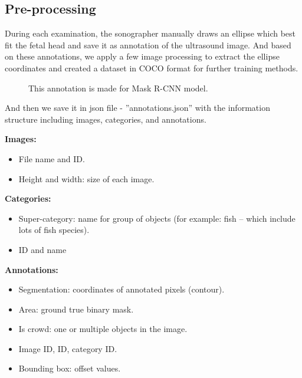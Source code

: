 	
\subsection{Pre-processing}
\label{subsection:preprocess}
\noindent

	During each examination, the sonographer manually draws an ellipse which best fit the fetal head and save it as annotation of the ultrasound image. And based on these annotations, we apply a few image processing to extract the ellipse coordinates and created a dataset in COCO format for further training methods.
	
	\begin{figure}[H]
		\centering
		\caption{This annotation is made for Mask R-CNN model.}
		\label{fig:processed_annotation}
	\end{figure}
	
	And then we save it in json file - ”annotations.json” with the information structure including images, categories, and annotations.

	\textbf{Images:}
\begin{itemize}
	\item File name and ID.
	\item Height and width: size of each image.
\end{itemize}

	\textbf{Categories:}
\begin{itemize}
	\item Super-category: name for group of objects (for example: fish – which include lots of fish species).
	\item ID and name
\end{itemize}

	\textbf{Annotations:}
\begin{itemize}
	\item Segmentation: coordinates of annotated pixels (contour).
	\item Area: ground true binary mask.
	\item Is crowd: one or multiple objects in the image.
	\item Image ID, ID, category ID.
	\item Bounding box: offset values.
\end{itemize}
	
